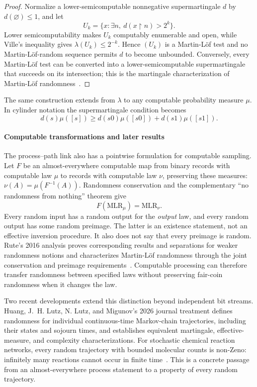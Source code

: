\documentclass[aps,pra,reprint,superscriptaddress,amsmath,amssymb,floatfix]{revtex4-2}
\theoremstyle{plain}
\theoremstyle{definition}
\theoremstyle{remark}
\begin{document}
\begin{proof}
Normalize a lower-semicomputable nonnegative supermartingale \(d\) by
\(d(\varnothing)\leq1\), and let
\[
  U_k=\{x:\exists n,\ d(x{\upharpoonright}n)>2^k\}.
\]
Lower semicomputability makes \(U_k\) computably enumerable and open, while
Ville's inequality gives \(\lambda(U_k)\leq2^{-k}\). Hence
\((U_k)\) is a Martin-L\"of test and no Martin-L\"of-random sequence permits
\(d\) to become unbounded. Conversely, every Martin-L\"of test can be converted
into a lower-semicomputable supermartingale that succeeds on its intersection;
this is the martingale characterization of Martin-L\"of
randomness~\cite{calude:02,Nies2009}.
\end{proof}

The same construction extends from \(\lambda\) to any computable probability
measure \(\mu\). In cylinder notation the supermartingale condition becomes
\[
 d(s)\mu([s])\geq
 d(s0)\mu([s0])+d(s1)\mu([s1]).
\]

\paragraph{Computable transformations and later results}

The process--path link also has a pointwise formulation for computable
sampling. Let \(F\) be an almost-everywhere computable map from binary
records with computable law \(\mu\) to records with computable law \(\nu\),
preserving these measures: \(\nu(A)=\mu(F^{-1}(A))\). Randomness conservation
and the complementary ``no randomness from nothing'' theorem give
\begin{equation}
  F(\mathrm{MLR}_\mu)=\mathrm{MLR}_\nu.
  \label{eq:randomness-conservation}
\end{equation}
Every random input has a random output for the \emph{output} law, and every
random output has some random preimage. The latter is an existence statement,
not an effective inversion procedure. It also does not say that every preimage
is random. Rute's 2016 analysis proves corresponding results and separations
for weaker randomness notions and characterizes Martin-L\"of randomness
through the joint conservation and preimage requirements~\cite{Rute2016}.
Computable processing can therefore transfer randomness between specified
laws without preserving fair-coin randomness when it changes the law.

Two recent developments extend this distinction beyond independent bit streams.
Huang, J.~H. Lutz, N. Lutz, and Migunov's 2026 journal treatment defines
randomness for individual continuous-time Markov-chain trajectories, including
their states and sojourn times, and establishes equivalent martingale,
effective-measure, and complexity characterizations. For stochastic chemical
reaction networks, every random trajectory with bounded molecular counts is
non-Zeno: infinitely many reactions cannot occur in finite
time~\cite{HuangLutzLutzMigunov2026}. This is a concrete passage from an
almost-everywhere process statement to a property of every random trajectory.
\end{document}
